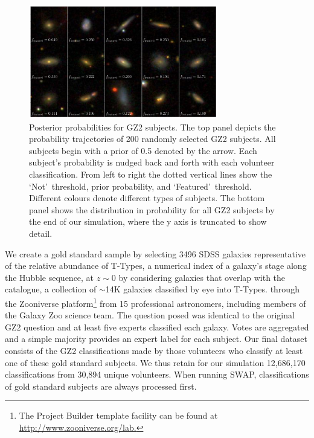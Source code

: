 \documentclass[twocolumn]{aastex6}%
\newcommand{\feat}{`Featured'}
\newcommand{\notfeat}{`Not'}
\begin{document}
\begin{figure}[t!] 
\centering
\includegraphics[width=3.25in]{f12.pdf}
\caption{Posterior probabilities for GZ2 subjects.  The top panel depicts the probability trajectories of 200 randomly selected GZ2 subjects. All subjects begin with a prior of 0.5 denoted by the arrow. Each subject's probability is nudged back and forth with each volunteer classification. From left to right the dotted vertical lines show the \notfeat~threshold, prior probability, and \feat~threshold. Different colours denote different types of subjects. The bottom panel shows the distribution in probability for all GZ2 subjects by the end of our simulation, where the y axis is truncated to show detail.  \label{fig: subject probabilities}}
\end{figure}

We create a gold standard sample by selecting 3496 SDSS galaxies representative 
of the relative abundance of T-Types, a numerical index of a galaxy's stage along 
the Hubble sequence, at $z\sim0$ by considering galaxies that overlap 
with the~\cite{NairAbraham2010} catalogue, a collection of $\sim$14K galaxies 
classified by eye into T-Types.  through the Zooniverse platform\footnote{The Project Builder template facility can be found at \url{http://www.zooniverse.org/lab.}}  
from 15 professional astronomers, including members of the Galaxy Zoo science team. 
 The question posed was identical to the original GZ2 question and at least five 
experts classified each galaxy. 
Votes are aggregated and a simple majority provides an expert label for each subject. 
Our final dataset consists of the GZ2 classifications made 
by those volunteers who classify at least one of these gold standard subjects. 
We thus retain for our simulation 12,686,170 classifications from 30,894 unique volunteers. 
When running SWAP, classifications of gold standard subjects are always processed first. 
\end{document}
